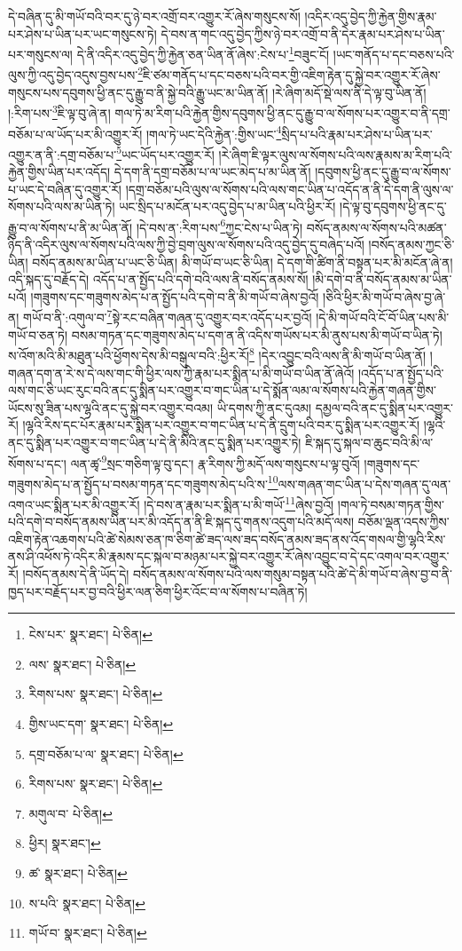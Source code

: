 དེ་བཞིན་དུ་མི་གཡོ་བའི་བར་དུ་ཉེ་བར་འགྲོ་བར་འགྱུར་རོ་ཞེས་གསུངས་སོ། །འདིར་འདུ་བྱེད་ཀྱི་རྐྱེན་གྱིས་རྣམ་པར་ཤེས་པ་ཡིན་པར་ཡང་གསུངས་ཏེ། དེ་བས་ན་གང་འདུ་བྱེད་ཀྱིས་ཉེ་བར་འགྲོ་བ་ནི་དེར་རྣམ་པར་ཤེས་པ་ཡིན་པར་གསུངས་ལ། དེ་ནི་འདིར་འདུ་བྱེད་ཀྱི་རྐྱེན་ཅན་ཡིན་ནོ་ཞེས་:ངེས་པ་\footnote{ངེས་པར་  སྣར་ཐང་།  པེ་ཅིན། }བཟུང་ངོ། །ཡང་གནོད་པ་དང་བཅས་པའི་ལུས་ཀྱི་འདུ་བྱེད་འདུས་བྱས་པས་\footnote{ལས་  སྣར་ཐང་།  པེ་ཅིན། }ཇི་ཙམ་གནོད་པ་དང་བཅས་པའི་བར་གྱི་འཇིག་རྟེན་དུ་སྐྱེ་བར་འགྱུར་རོ་ཞེས་གསུངས་པས་དབུགས་ཕྱི་ནང་དུ་རྒྱུ་བ་ནི་སྐྱེ་བའི་རྒྱུ་ཡང་མ་ཡིན་ནོ། །རེ་ཞིག་མདོ་སྡེ་ལས་ནི་དེ་ལྟ་བུ་ཡིན་ནོ། །:རིག་པས་\footnote{རིགས་པས་  སྣར་ཐང་།  པེ་ཅིན། }ཇི་ལྟ་བུ་ཞེ་ན། གལ་ཏེ་མ་རིག་པའི་རྐྱེན་གྱིས་དབུགས་ཕྱི་ནང་དུ་རྒྱུ་བ་ལ་སོགས་པར་འགྱུར་བ་ནི་དགྲ་བཅོམ་པ་ལ་ཡོད་པར་མི་འགྱུར་རོ། །གལ་ཏེ་ཡང་དེའི་རྐྱེན་:གྱིས་ཡང་\footnote{གྱིས་ཡང་དག་  སྣར་ཐང་།  པེ་ཅིན། }སྲིད་པ་པའི་རྣམ་པར་ཤེས་པ་ཡིན་པར་འགྱུར་ན་ནི་:དགྲ་བཅོམ་པ་\footnote{དགྲ་བཅོམ་པ་ལ་  སྣར་ཐང་།  པེ་ཅིན། }ཡང་ཡོད་པར་འགྱུར་རོ། །རེ་ཞིག་ཇི་ལྟར་ལུས་ལ་སོགས་པའི་ལས་རྣམས་མ་རིག་པའི་རྐྱེན་གྱིས་ཡིན་པར་འདོད། དེ་དག་ནི་དགྲ་བཅོམ་པ་ལ་ཡང་མེད་པ་མ་ཡིན་ནོ། །དབུགས་ཕྱི་ནང་དུ་རྒྱུ་བ་ལ་སོགས་པ་ཡང་དེ་བཞིན་དུ་འགྱུར་རོ། །དགྲ་བཅོམ་པའི་ལུས་ལ་སོགས་པའི་ལས་གང་ཡིན་པ་འདོད་ན་ནི་དེ་དག་ནི་ལུས་ལ་སོགས་པའི་ལས་མ་ཡིན་ཏེ། ཡང་སྲིད་པ་མངོན་པར་འདུ་བྱེད་པ་མ་ཡིན་པའི་ཕྱིར་རོ། །དེ་ལྟ་བུ་དབུགས་ཕྱི་ནང་དུ་རྒྱུ་བ་ལ་སོགས་པ་ནི་མ་ཡིན་ནོ། །དེ་བས་ན་:རིག་པས་\footnote{རིགས་པས་  སྣར་ཐང་།  པེ་ཅིན། }ཀྱང་ངེས་པ་ཡིན་ཏེ། བསོད་ནམས་ལ་སོགས་པའི་མཚན་ཉིད་ནི་འདིར་ལུས་ལ་སོགས་པའི་ལས་ཀྱི་བྱེ་བྲག་ལུས་ལ་སོགས་པའི་འདུ་བྱེད་དུ་བཞེད་པའོ། །བསོད་ནམས་ཀྱང་ཅི་ཡིན། བསོད་ནམས་མ་ཡིན་པ་ཡང་ཅི་ཡིན། མི་གཡོ་བ་ཡང་ཅི་ཡིན། དེ་དག་གི་ཚིག་ནི་བསྟན་པར་མི་མངོན་ཞེ་ན། འདི་སྐད་དུ་བརྗོད་དེ། འདོད་པ་ན་སྤྱོད་པའི་དགེ་བའི་ལས་ནི་བསོད་ནམས་སོ། །མི་དགེ་བ་ནི་བསོད་ནམས་མ་ཡིན་པའོ། །གཟུགས་དང་གཟུགས་མེད་པ་ན་སྤྱོད་པའི་དགེ་བ་ནི་མི་གཡོ་བ་ཞེས་བྱའོ། །ཅིའི་ཕྱིར་མི་གཡོ་བ་ཞེས་བྱ་ཞེ་ན། གཡོ་བ་ནི་:འགུལ་བ་\footnote{མགུལ་བ་  པེ་ཅིན། }སྟེ་རང་བཞིན་གཞན་དུ་འགྱུར་བར་འདོད་པར་བྱའོ། །དེ་མི་གཡོ་བའི་ངོ་བོ་ཡིན་པས་མི་གཡོ་བ་ཅན་ཏེ། བསམ་གཏན་དང་གཟུགས་མེད་པ་དག་ན་ནི་འདིས་གཡོས་པར་མི་ནུས་པས་མི་གཡོ་བ་ཡིན་ཏེ། ས་འོག་མའི་མི་མཐུན་པའི་ཕྱོགས་དེས་མི་བསྒུལ་བའི་:ཕྱིར་རོ།\footnote{ཕྱིར།  སྣར་ཐང་། } །དེར་འབྱུང་བའི་ལས་ནི་མི་གཡོ་བ་ཡིན་ནོ། །གཞན་དག་ན་རེ་ས་དེ་ལས་གང་གི་ཕྱིར་ལས་ཀྱི་རྣམ་པར་སྨིན་པ་མི་གཡོ་བ་ཡིན་ནོ་ཞེའོ། །འདོད་པ་ན་སྤྱོད་པའི་ལས་གང་ཅི་ཡང་རུང་བའི་ནང་དུ་སྨིན་པར་འགྱུར་བ་གང་ཡིན་པ་དེ་སྨོན་ལམ་ལ་སོགས་པའི་རྐྱེན་གཞན་གྱིས་ཡོངས་སུ་ཟིན་པས་ལྷའི་ནང་དུ་སྐྱེ་བར་འགྱུར་བའམ། ཡི་དགས་ཀྱི་ནང་དུའམ། དམྱལ་བའི་ནང་དུ་སྨིན་པར་འགྱུར་རོ། །ལྷའི་རིས་དང་པོར་རྣམ་པར་སྨིན་པར་འགྱུར་བ་གང་ཡིན་པ་དེ་ནི་དྲུག་པའི་བར་དུ་སྨིན་པར་འགྱུར་རོ། །ལྷའི་ནང་དུ་སྨིན་པར་འགྱུར་བ་གང་ཡིན་པ་དེ་ནི་མིའི་ནང་དུ་སྨིན་པར་འགྱུར་ཏེ། ཇི་སྐད་དུ་སྐལ་བ་ཆུང་བའི་མི་ལ་སོགས་པ་དང་། ལན་ཚྭ་\footnote{ཚ་  སྣར་ཐང་།  པེ་ཅིན། }སྲང་གཅིག་ལྟ་བུ་དང་། རྣ་རིགས་ཀྱི་མདོ་ལས་གསུངས་པ་ལྟ་བུའོ། །གཟུགས་དང་གཟུགས་མེད་པ་ན་སྤྱོད་པ་བསམ་གཏན་དང་གཟུགས་མེད་པའི་ས་\footnote{ས་པའི་  སྣར་ཐང་།  པེ་ཅིན། }ལས་གཞན་གང་ཡིན་པ་དེས་གཞན་དུ་ལན་འགའ་ཡང་སྨིན་པར་མི་འགྱུར་རོ། །དེ་བས་ན་རྣམ་པར་སྨིན་པ་མི་གཡོ་\footnote{གཡོ་བ་  སྣར་ཐང་།  པེ་ཅིན། }ཞེས་བྱའོ། །གལ་ཏེ་བསམ་གཏན་གྱིས་པའི་དགེ་བ་བསོད་ནམས་ཡིན་པར་མི་འདོད་ན་ནི་ཇི་སྐད་དུ་གནས་འདུག་པའི་མདོ་ལས། བཅོམ་ལྡན་འདས་ཀྱིས་འཇིག་རྟེན་འཆགས་པའི་ཚེ་སེམས་ཅན་ཁ་ཅིག་ཚེ་ཟད་ལས་ཟད་བསོད་ནམས་ཟད་ནས་འོད་གསལ་གྱི་ལྷའི་རིས་ནས་ཤི་འཕོས་ཏེ་འདིར་མི་རྣམས་དང་སྐལ་བ་མཉམ་པར་སྐྱེ་བར་འགྱུར་རོ་ཞེས་འབྱུང་བ་དེ་དང་འགལ་བར་འགྱུར་རོ། །བསོད་ནམས་དེ་ནི་ཡོད་དེ། བསོད་ནམས་ལ་སོགས་པའི་ལས་གསུམ་བསྟན་པའི་ཚེ་དེ་མི་གཡོ་བ་ཞེས་བྱ་བ་ནི་ཁྱད་པར་བརྗོད་པར་བྱ་བའི་ཕྱིར་ལན་ཅིག་ཕྱིར་འོང་བ་ལ་སོགས་པ་བཞིན་ཏེ། 